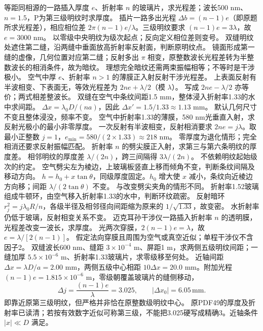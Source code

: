 \problemtext 等距同相源的一路插入厚度 $e$、折射率 $n$ 的玻璃片，求光程差；波长500 nm、$n=1.5$，P为第三级明纹时求厚度。
\workings 插片一路多出光程 $\Delta b=(n-1)e$（即原题所求光程差），相应相位差 $2\pi(n-1)e/\lambda$。三级明纹要求 $(n-1)e=3\lambda$，故 $e=3000$ nm。
\crosscheck 以零级中央明纹为级次起点；反向定义相位差则变号。
\problemtext 双缝明纹处遮住第二缝，沿两缝中垂面放高折射率反射面，判断原明纹点。
\workings 镜面形成第一缝的虚像，几何位置对应第二缝；反射多出 $\pi$ 相变，原整数波长光程差转为半整数波长的相消条件，故为暗纹。
\crosscheck 理想完全暗纹还需两束振幅相等；不等时是干涉极小。
\problemtext 空气中厚 $e$、折射率 $n>1$ 的薄膜正入射反射干涉光程差。
\workings 上表面反射有半波相变、下表面无，等效光程差为 $2ne+\lambda/2$（模 $\lambda$）。
\crosscheck 写成 $2ne-\lambda/2$ 亦等价；两式相差整波长。
\problemtext 双缝在空气中条纹间距1.5 mm，整体浸入折射率1.33的水中求间距。
\workings $\Delta x=\lambda_0D/(na)$，因此 $\Delta x'=1.5/1.33\approx1.13$ mm。
\crosscheck 默认几何尺寸不变且整体浸没，频率不变。
\problemtext 空气中折射率1.33的薄膜，580 nm光垂直入射，求反射光极小的最小非零厚度。
\workings 一次反射有半波相变，反射相消要求 $2ne=j\lambda$。取最小正整数 $j=1$，$e_{\min}=580/(2\times1.33)\approx218$ nm。
\crosscheck 零厚度为退化情形；完全相消还要求反射振幅匹配。
\problemtext 折射率 $n$ 的劈尖膜正入射，求第三与第六条明纹的厚度差。
\workings 相邻明纹的厚度差 $\lambda/(2n)$，跨三间隔得 $3\lambda/(2n)$。
\crosscheck 不依赖明纹起始级次的约定。
\problemtext 空气劈尖左为棱边，上玻璃板竖直上移而倾角不变，判断条纹间隔及移动方向。
\workings $h=h_0+x\tan\theta$，同级厚度固定。$h_0$ 增大使 $x$ 减小，条纹向近棱边方向移；间距 $\lambda/(2\tan\theta)$ 不变。
\crosscheck 与改变劈尖夹角的情形不同。
\problemtext 折射率1.52玻璃组成牛顿环，由空气移入折射率1.33的水中，判断环纹疏密。
\workings 反射暗环 $r_j^2=j\lambda_0R/n$，各级半径及相邻径向间距缩为原来的 $1/\sqrt{1.33}$，故变密。
\crosscheck 水折射率仍低于玻璃，反射相变关系不变。
\problemtext 迈克耳孙干涉仪一路插入折射率 $n$ 的透明膜，光程差改变一波长，求厚度。
\workings 光两次穿膜，$2(n-1)e=\lambda$，故 $e=\lambda/[2(n-1)]$。
\crosscheck 假定法向穿膜且周围为空气或真空近似；单程干涉仪不含因子2。
\problemtext 双缝波长600 nm、缝距 $3\times10^{-4}$ m、屏距1 m，求两侧五级明纹间距；一缝加厚 $5.5\times10^{-6}$ m、折射率1.33玻璃片，求零级移至何处。
\workings 近轴间距 $\Delta x=\lambda D/a=2.00$ mm，两侧五级中心相距 $10\Delta x=20.0$ mm。附加光程 $(n-1)e=1.815\times10^{-6}$ m，零级朝覆盖玻璃片的缝侧移动，
\[
\Delta j=\frac{(n-1)e}{\lambda}=3.025,\qquad
|\Delta x_0|=6.05\,\mathrm{mm}.
\]
即靠近原第三级明纹，但严格并非恰在原整数级明纹中心。
\crosscheck 原PDF49的厚度及折射率已读清；若按有效数字近似可称第三级，不能把3.025硬写成精确3。近轴条件 $|x|\ll D$ 满足。

